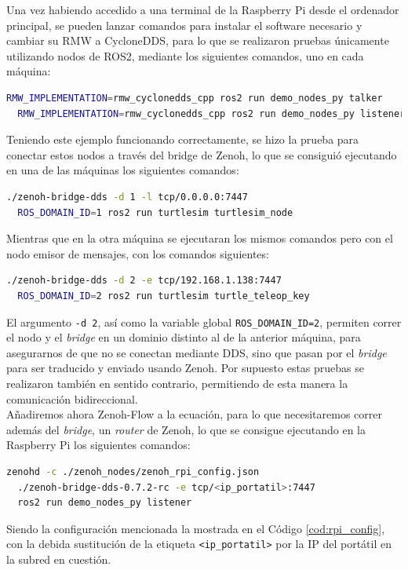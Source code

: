 Una vez habiendo accedido a una terminal de la Raspberry Pi desde el ordenador
principal, se pueden lanzar comandos para instalar el software necesario y
cambiar su RMW a CycloneDDS, para lo que se realizaron pruebas únicamente
utilizando nodos de ROS2, mediante los siguientes comandos, uno en cada máquina:
\begin{lstlisting}[language=bash]
  RMW_IMPLEMENTATION=rmw_cyclonedds_cpp ros2 run demo_nodes_py talker
  RMW_IMPLEMENTATION=rmw_cyclonedds_cpp ros2 run demo_nodes_py listener
\end{lstlisting}

Teniendo este ejemplo funcionando correctamente, se hizo la prueba para conectar
estos nodos a través del bridge de Zenoh, lo que se consiguió ejecutando en una
de las máquinas los siguientes comandos:
\begin{lstlisting}[language=bash]
  ./zenoh-bridge-dds -d 1 -l tcp/0.0.0.0:7447
  ROS_DOMAIN_ID=1 ros2 run turtlesim turtlesim_node
\end{lstlisting}

Mientras que en la otra máquina se ejecutaran los mismos comandos pero con el
nodo emisor de mensajes, con los comandos siguientes:
\begin{lstlisting}[language=bash]
  ./zenoh-bridge-dds -d 2 -e tcp/192.168.1.138:7447
  ROS_DOMAIN_ID=2 ros2 run turtlesim turtle_teleop_key
\end{lstlisting}

El argumento \verb|-d 2|, así como la variable global \verb|ROS_DOMAIN_ID=2|,
permiten correr el nodo y el \textit{bridge} en un dominio distinto al de la
anterior máquina, para asegurarnos de que no se conectan mediante DDS, sino
que pasan por el \textit{bridge} para ser traducido y enviado usando Zenoh.
Por supuesto estas pruebas se realizaron también en sentido contrario,
permitiendo de esta manera la comunicación bidireccional.
\\

Añadiremos ahora Zenoh-Flow a la ecuación, para lo que necesitaremos correr
además del \textit{bridge}, un \textit{router} de Zenoh, lo que se consigue
ejecutando en la Raspberry Pi los siguientes comandos:
\begin{lstlisting}[language=bash]
  zenohd -c ./zenoh_nodes/zenoh_rpi_config.json
  ./zenoh-bridge-dds-0.7.2-rc -e tcp/<ip_portatil>:7447
  ros2 run demo_nodes_py listener
\end{lstlisting}

Siendo la configuración mencionada la mostrada en el Código
\ref{cod:rpi_config}, con la debida sustitución de la etiqueta
\verb|<ip_portatil>| por la IP del portátil en la subred en cuestión.
\\

